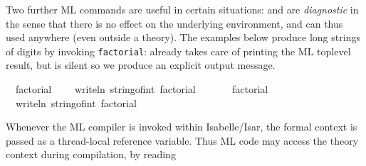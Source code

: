 \begin{isabellebody}
\begin{isamarkuptext}
  \medskip Two further ML commands are useful in certain situations:
  \hyperlink{command.ML-val}{\mbox{}} and \hyperlink{command.ML-command}{\mbox{}} are
  \emph{diagnostic} in the sense that there is no effect on the
  underlying environment, and can thus used anywhere (even outside a
  theory).  The examples below produce long strings of digits by
  invoking \verb|factorial|: \hyperlink{command.ML-val}{\mbox{}} already takes care of
  printing the ML toplevel result, but \hyperlink{command.ML-command}{\mbox{}} is silent
  so we produce an explicit output message.%
\end{isamarkuptext}%
\isamarkuptrue%
%
\isadelimML
%
\endisadelimML
%
\isatagML
{}\isamarkupfalse%
\ {\isacharverbatimopen}\ factorial\ {}{}{}\ {\isacharverbatimclose}\isanewline
{}\isamarkupfalse%
\ {\isacharverbatimopen}\ writeln\ {\isacharparenleft}string{\isacharunderscore}of{\isacharunderscore}int\ {\isacharparenleft}factorial\ {}{}{}{\isacharparenright}{\isacharparenright}\ {\isacharverbatimclose}%
\endisatagML
{\isafoldML}%
%
\isadelimML
%
\endisadelimML
\isanewline
\isanewline
{}\isamarkupfalse%
\isanewline
%
\isadelimML
\ \ %
\endisadelimML
%
\isatagML
{}\isamarkupfalse%
\ {\isacharverbatimopen}\ factorial\ {}{}{}\ {\isacharverbatimclose}\ \ \isanewline
\ \ \isamarkupfalse%
\ {\isacharverbatimopen}\ writeln\ {\isacharparenleft}string{\isacharunderscore}of{\isacharunderscore}int\ {\isacharparenleft}factorial\ {}{}{}{\isacharparenright}{\isacharparenright}\ {\isacharverbatimclose}%
\endisatagML
{\isafoldML}%
%
\isadelimML
\isanewline
%
\endisadelimML
%
\isadelimproof
%
\endisadelimproof
%
\isatagproof
{}\isamarkupfalse%
%
\endisatagproof
{\isafoldproof}%
%
\isadelimproof
%
\endisadelimproof
%
\isamarkuptrue%
%
\begin{isamarkuptext}%
Whenever the ML compiler is invoked within Isabelle/Isar, the
  formal context is passed as a thread-local reference variable.  Thus
  ML code may access the theory context during compilation, by reading

\end{isamarkuptext}
\end{isabellebody}
